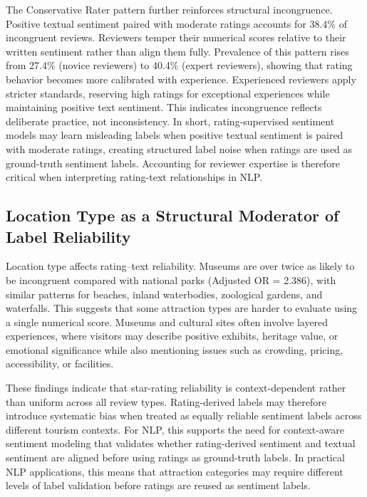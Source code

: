 \documentclass[conference]{IEEEtran}
\begin{document}
The Conservative Rater pattern further reinforces structural incongruence. Positive textual sentiment paired with moderate ratings accounts for 38.4\% of incongruent reviews. Reviewers temper their numerical scores relative to their written sentiment rather than align them fully.
Prevalence of this pattern rises from 27.4\% (novice reviewers) to 40.4\% (expert reviewers), showing that rating behavior becomes more calibrated with experience. Experienced reviewers apply stricter standards, reserving high ratings for exceptional experiences while maintaining positive text sentiment. This indicates incongruence reflects deliberate practice, not inconsistency. In short, rating-supervised sentiment models may learn misleading labels when positive textual sentiment is paired with moderate ratings, creating structured label noise when ratings are used as ground-truth sentiment labels. Accounting for reviewer expertise is therefore critical when interpreting rating-text relationships in NLP.

\subsection{Location Type as a Structural Moderator of Label Reliability}
Location type affects rating–text reliability. Museums are over twice as likely to be incongruent compared with national parks (Adjusted OR = 2.386), with similar patterns for beaches, inland waterbodies, zoological gardens, and waterfalls. This suggests that some attraction types are harder to evaluate using a single numerical score. Museums and cultural sites often involve layered experiences, where visitors may describe positive exhibits, heritage value, or emotional significance while also mentioning issues such as crowding, pricing, accessibility, or facilities.

These findings indicate that star-rating reliability is context-dependent rather than uniform across all review types. Rating-derived labels may therefore introduce systematic bias when treated as equally reliable sentiment labels across different tourism contexts. For NLP, this supports the need for context-aware sentiment modeling that validates whether rating-derived sentiment and textual sentiment are aligned before using ratings as ground-truth labels. In practical NLP applications, this means that attraction categories may require different levels of label validation before ratings are reused as sentiment labels.
\end{document}
